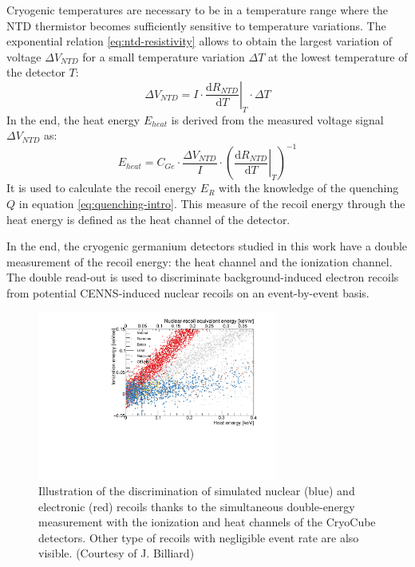 Cryogenic temperatures are necessary to be in a temperature range where the NTD thermistor becomes sufficiently sensitive to temperature variations. The exponential relation \ref{eq:ntd-resistivity} allows to obtain the largest variation of voltage $\Delta V_{NTD}$ for a small temperature variation $\Delta T$ at the lowest temperature of the detector $T$:
\begin{equation}
\Delta V_{NTD} = 
I \cdot
\left. \frac{\mathrm{d}R_{NTD}}{\mathrm{d}T} \right|_{T}
\cdot
\Delta T
\end{equation}
In the end, the heat energy $E_{heat}$ is derived from the measured voltage signal $\Delta V_{NTD}$ as:
\begin{equation}
E_{heat} = C_{Ge} \cdot \frac{\Delta V_{NTD}}{I} \cdot
\left( \left. \frac{\mathrm{d}R_{NTD}}{\mathrm{d}T} \right|_{T} \right)^{-1}
\end{equation}
It is used to calculate the recoil energy $E_R$ with the knowledge of the quenching $Q$ in equation \ref{eq:quenching-intro}. This measure of the recoil energy through the heat energy is defined as the heat channel of the detector.

In the end, the cryogenic germanium detectors studied in this work have a double measurement of the recoil energy: the heat channel and the ionization channel. The double read-out is used to discriminate background-induced electron recoils from potential CENNS-induced nuclear recoils on an event-by-event basis.

\begin{figure}
\centering
\includegraphics [width=0.7\textwidth]{Figures/Experiment/discrimination_simulation.pdf}
\caption{Illustration of the discrimination of simulated nuclear (blue) and electronic (red) recoils thanks to the simultaneous double-energy measurement with the ionization and heat channels  of the CryoCube detectors. Other type of recoils with negligible event rate are also visible. (Courtesy of J. Billiard)}
\label{fig:discrimination-simulation}
\end{figure}

